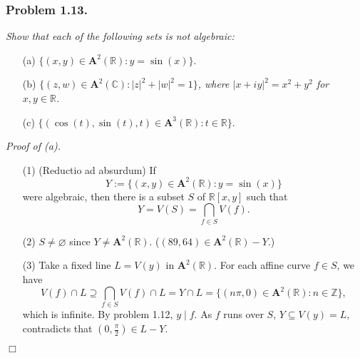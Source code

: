 \documentclass{article}
\begin{document}



\subsubsection*{Problem 1.13.}
\emph{Show that each of the following sets is not algebraic:}
\begin{enumerate}
\item[(a)]
  $\{ (x,y) \in \mathbf{A}^{2}(\mathbb{R}) : y = \sin(x) \}$.

\item[(b)]
  \emph{$\{ (z,w) \in \mathbf{A}^{2}(\mathbb{C}) : |z|^2 + |w|^2 = 1 \}$,
  where $|x+iy|^2 = x^2 + y^2$ for $x, y \in \mathbb{R}$.}

\item[(c)]
  $\{ (\cos(t), \sin(t), t) \in \mathbf{A}^3(\mathbb{R}) : t \in \mathbb{R} \}$. \\
\end{enumerate}



\emph{Proof of (a).}
\begin{enumerate}
\item[(1)]
  (Reductio ad absurdum)
  If
  \[
    Y := \{ (x,y) \in \mathbf{A}^{2}(\mathbb{R}) : y = \sin(x) \}
  \]
  were algebraic,
  then there is a subset $S$ of $\mathbb{R}[x,y]$ such that
  \[
    Y = V(S) = \bigcap_{f \in S} V(f).
  \]

\item[(2)]
  $S \neq \varnothing$ since $Y \neq \mathbf{A}^{2}(\mathbb{R})$.
  ($(89,64) \in \mathbf{A}^{2}(\mathbb{R})-Y$.)

\item[(3)]
  Take a fixed line $L = V(y)$ in $\mathbf{A}^{2}(\mathbb{R})$.
  For each affine curve $f \in S$, we have
  \[
    V(f) \cap L
    \supseteq
    \bigcap_{f \in S} V(f) \cap L
    = Y \cap L
    = \{ (n\pi,0) \in \mathbf{A}^{2}(\mathbb{R}) : n \in \mathbb{Z} \},
  \]
  which is infinite.
  By problem 1.12, $y \mid f$.
  As $f$ runs over $S$, $Y \subseteq V(y) = L$,
  contradicts that $\left(0,\frac{\pi}{2}\right) \in L-Y$.
\end{enumerate}
$\Box$ \\\\
\end{document}

